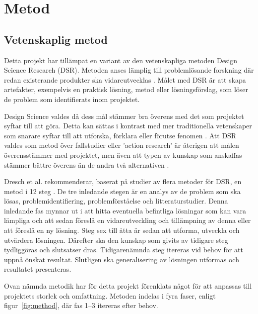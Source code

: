 \section{Metod} %
\label{sec:metod}
    
    \subsection{Vetenskaplig metod} %
    \label{sub:vetenskaplig_metod}
    	Detta projekt har tillämpat en variant av den vetenskapliga metoden Design Science Research (DSR). Metoden anses lämplig till problemlösande forskning där redan existerande produkter ska vidareutvecklas \cite{dsr}. Målet med DSR är att skapa artefakter, exempelvis en praktisk lösning, metod eller lösningsförslag, som löser de problem som identifierats inom projektet. \bigskip

        Design Science valdes då dess mål stämmer bra överens med det som projektet syftar till att göra. Detta kan sättas i kontrast med mer traditionella vetenskaper som snarare syftar till att utforska, förklara eller förutse fenomen \cite[s.~13]{dsr}. Att DSR valdes som metod över fallstudier eller 'action research' är återigen att målen överensstämmer med projektet, men även att typen av kunskap som anskaffas stämmer bättre överens än de andra två alternativen \cite[s.~95]{dsr}.\bigskip

    	Dresch et al. rekommenderar, baserat på studier av flera metoder för DSR, en metod i 12 steg \cite[s.~118--126]{dsr}. De tre inledande stegen är en analys av de problem som ska lösas, problemidentifiering, problemförståelse och litteraturstudier. Denna inledande fas mynnar ut i att hitta eventuella befintliga lösningar som kan vara lämpliga och att sedan föreslå en vidareutveckling och tillämpning av denna eller att föreslå en ny lösning. Steg sex till åtta är sedan att utforma, utveckla och utvärdera lösningen. Därefter ska den kunskap som givits av tidigare steg tydliggöras och slutsatser dras. Tidigarenämnda steg itereras vid behov för att uppnå önskat resultat. Slutligen ska generalisering av lösningen utformas och resultatet presenteras. \bigskip

    	Ovan nämnda metodik har för detta projekt förenklats något för att anpassas till projektets storlek och omfattning. Metoden indelas i fyra faser, enligt figur~\ref{fig:method}, där fas 1--3 itereras efter behov.

